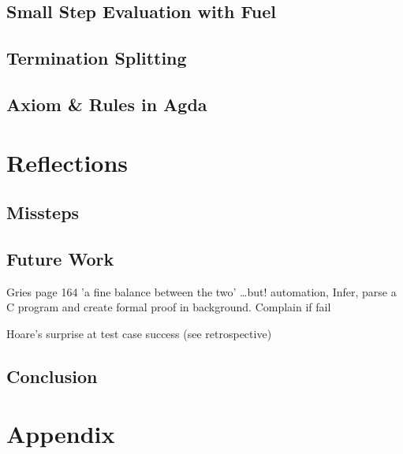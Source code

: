 \documentclass[oneside,12pt]{article}
\begin{document}
\subsection{Small Step Evaluation with Fuel}

\subsection{Termination Splitting}

\subsection{Axiom \& Rules in Agda}

\section{Reflections}

\subsection{Missteps}

\subsection{Future Work}

Gries page 164 'a fine balance between the two' \ldots but! automation, Infer, parse a C program and create formal proof in background. Complain if fail

Hoare's surprise at test case success (see retrospective)

\subsection{Conclusion}


\section{Appendix}


\nocite{*}






  
\end{document}
